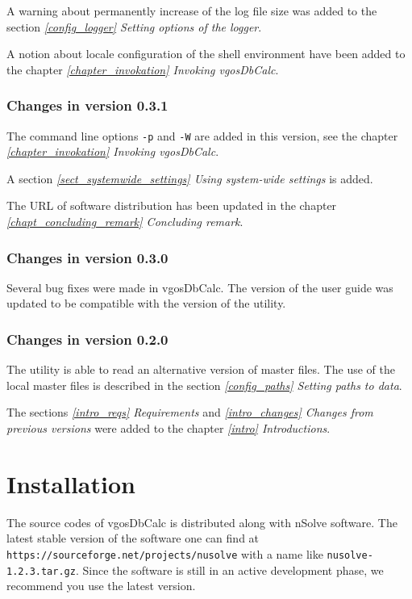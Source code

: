 \documentclass [10pt,letterpaper]{report}
\newcommand{\nuSolve}{\greektext n\latintext Solve}
\begin{document}
A warning about permanently increase of the log file size was added to the section
\emph{\ref{config_logger} Setting options of the logger}.

A notion about locale configuration of the shell environment have been
added to the chapter \emph{\ref{chapter_invokation} Invoking vgosDbCalc}.


\subsection{Changes in version 0.3.1}
The command line options {\tt -p} and {\tt -W} are added in this version, see
the chapter \emph{\ref{chapter_invokation} Invoking vgosDbCalc}.

A section \emph{\ref{sect_systemwide_settings} Using system-wide settings} is added.

The URL of software distribution has been updated in the chapter
\emph{\ref{chapt_concluding_remark} Concluding remark}.


\subsection{Changes in version 0.3.0}
Several bug fixes were made in vgosDbCalc.
The version of the user guide was updated to be compatible with the version of the
utility.

\subsection{Changes in version 0.2.0}
The utility is able to read an alternative version of master files. The
use of the local master files is described in the section
\emph{\ref{config_paths} Setting paths to data}.

The sections \emph{\ref{intro_reqs} Requirements} and
\emph{\ref{intro_changes} Changes from previous versions} were added to
the chapter \emph{\ref{intro} Introductions}.








%
%
\chapter{Installation}
\label{chapter_installation}

The source codes of vgosDbCalc is distributed along with \nuSolve{}
software. The latest stable version of the software one can find at
{\tt https://sourceforge.net/projects/nusolve} with a name like
{\tt nusolve-1.2.3.tar.gz}. Since the software is still in an active
development phase, we recommend you use the latest version.
\end{document}
